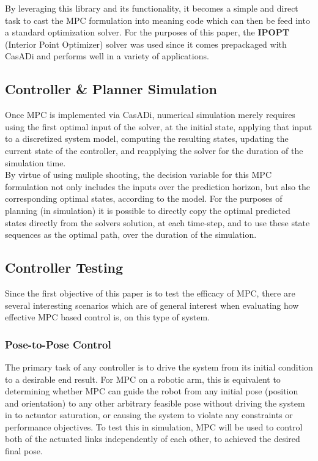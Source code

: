 \documentclass[journal]{IEEEtran}
\begin{document}
By leveraging this library and its functionality, it becomes a simple and direct task to cast the MPC formulation into meaning code which can then be feed into a standard optimization solver. For the purposes of this paper, the \textbf{IPOPT} (Interior Point Optimizer) solver was used since it comes prepackaged with CasADi and performs well in a variety of applications.

\subsection{Controller \& Planner Simulation}

Once MPC is implemented via CasADi, numerical simulation merely requires using the first optimal input of the solver, at the initial state, applying that input to a discretized system model, computing the resulting states, updating the current state of the controller, and reapplying the solver for the duration of the simulation time.\\

By virtue of using muliple shooting, the decision variable for this MPC formulation not only includes the inputs over the prediction horizon, but also the corresponding optimal states, according to the model. For the purposes of planning (in simulation) it is possible to directly copy the optimal predicted states directly from the solvers solution, at each time-step, and to use these state sequences as the optimal path, over the duration of the simulation.

\subsection{Controller Testing}

Since the first objective of this paper is to test the efficacy of MPC, there are several interesting scenarios which are of general interest when evaluating how effective MPC based control is, on this type of system. \\

\subsubsection{Pose-to-Pose Control}
The primary task of any controller is to drive the system from its initial condition to a desirable end result. For MPC on a robotic arm, this is equivalent to determining whether MPC can guide the robot from any initial pose (position and orientation) to any other arbitrary feasible pose without driving the system in to actuator saturation, or causing the system to violate any constraints or performance objectives. To test this in simulation, MPC will be used to control both of the actuated links independently of each other, to achieved the desired final pose.\\
\end{document}
